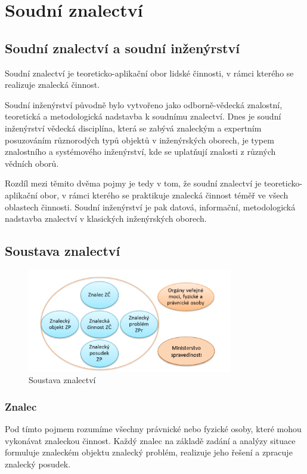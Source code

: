 \section{Soudní znalectví}
\subsection{Soudní znalectví a soudní inženýrství}
Soudní znalectví je teoreticko-aplikační obor lidské činnosti, v rámci kterého se realizuje znalecká činnost.

Soudní inženýrství původně bylo vytvořeno jako odborně-vědecká znalostní, teoretická a metodologická nadstavba k soudnímu znalectví. Dnes je soudní inženýrství
vědecká disciplína, která se zabývá znaleckým a expertním posuzováním různorodých typů objektů v inženýrských oborech, je typem znalostního a systémového
inženýrství, kde se uplatňují znalosti z různých vědních oborů.

Rozdíl mezi těmito dvěma pojmy je tedy v tom, že soudní znalectví je teoreticko-aplikační obor, v rámci kterého se praktikuje znalecká činnost téměř ve všech
oblastech činnosti. Soudní inženýrství je pak datová, informační, metodologická nadstavba znalectví v klasických inženýrských oborech.

\subsection{Soustava znalectví}
\begin{figure}[h]
    \centering
    \includegraphics[width=0.8\textwidth]{images/soustava.png}
    \caption{Soustava znalectví}
    \label{fig:soustava_znalectvi}
\end{figure}
\subsubsection*{Znalec}
Pod tímto pojmem rozumíme všechny právnické nebo fyzické osoby, které mohou vykonávat znaleckou činnost. Každý znalec na základě zadání a analýzy situace 
formuluje znaleckém objektu znalecký problém, realizuje jeho řešení a zpracuje znalecký posudek.
